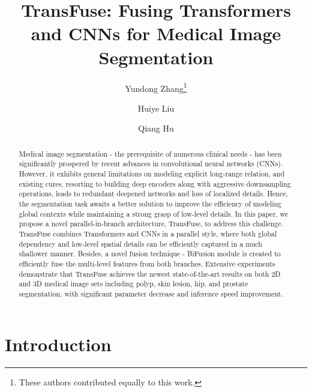 \documentclass[runningheads]{llncs}
\makeatletter
\newcommand{\printfnsymbol}[1]{\textsuperscript{\@fnsymbol{#1}}}
\makeatother
\begin{document}
\title{TransFuse: Fusing Transformers and CNNs for Medical Image Segmentation} 
\author{Yundong Zhang\thanks{These authors contributed equally to this work.}  \and
Huiye Liu\printfnsymbol{1}   \and
Qiang Hu}



\maketitle              \begin{abstract}
Medical image segmentation - the prerequisite of numerous clinical needs - has been significantly prospered by recent advances in convolutional neural networks (CNNs). However, it exhibits general limitations on modeling explicit long-range relation, and existing cures, resorting to building deep encoders along with aggressive downsampling operations, leads to redundant deepened networks and loss of localized details. Hence, the segmentation task awaits a better solution to improve the efficiency of modeling global contexts while maintaining a strong grasp of low-level details. 
In this paper, we propose a novel parallel-in-branch architecture, TransFuse, to address this challenge. TransFuse combines Transformers and CNNs in a parallel style, where both global dependency and low-level spatial details can be efficiently captured in a much shallower manner. Besides, a novel fusion technique - BiFusion module is created to efficiently fuse the multi-level features from both branches. 
Extensive experiments demonstrate that TransFuse achieves the newest state-of-the-art results on both 2D and 3D medical image sets including polyp, skin lesion, hip, and prostate segmentation, with significant parameter decrease and inference speed improvement.



\end{abstract}

\section{Introduction}
\end{document}
